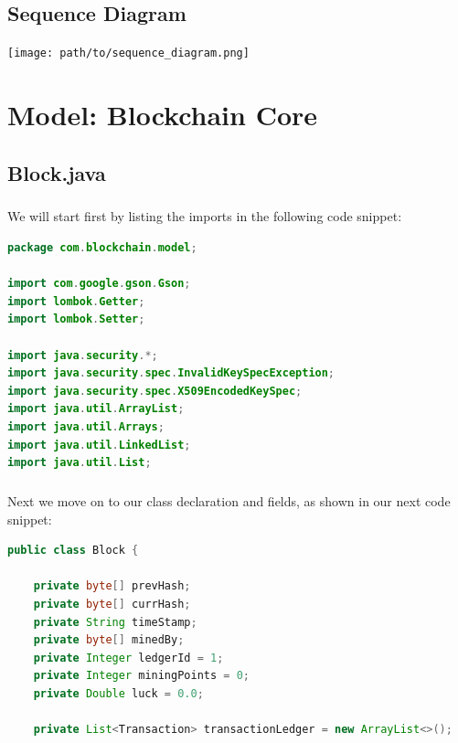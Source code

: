 \documentclass[12pt,a4paper]{report}
\begin{document}
\section{Sequence Diagram}
\texttt{[image: path/to/sequence\_diagram.png]}


\chapter{Model: Blockchain Core}


\section{Block.java}
\paragraph{}
We will start first by listing the imports in the following code snippet:
\begin{lstlisting}[language=Java]
package com.blockchain.model;

import com.google.gson.Gson;
import lombok.Getter;
import lombok.Setter;

import java.security.*;
import java.security.spec.InvalidKeySpecException;
import java.security.spec.X509EncodedKeySpec;
import java.util.ArrayList;
import java.util.Arrays;
import java.util.LinkedList;
import java.util.List;
\end{lstlisting}
\paragraph{}
Next we move on to our class declaration and fields, as shown in our next code snippet:

\begin{lstlisting}[language=Java]
public class Block {

    private byte[] prevHash;
    private byte[] currHash;    
    private String timeStamp; 
    private byte[] minedBy;
    private Integer ledgerId = 1;
    private Integer miningPoints = 0;
    private Double luck = 0.0;

    private List<Transaction> transactionLedger = new ArrayList<>();
\end{lstlisting}
\end{document}
